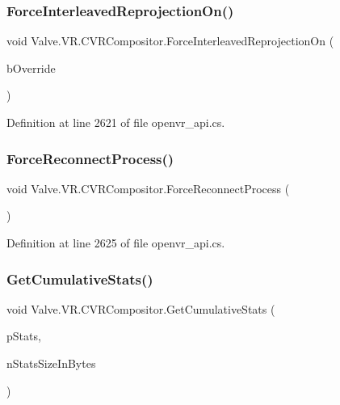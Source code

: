 \subsubsection{\texorpdfstring{ForceInterleavedReprojectionOn()}{ForceInterleavedReprojectionOn()}}
{\footnotesize\ttfamily void Valve.\+V\+R.\+C\+V\+R\+Compositor.\+Force\+Interleaved\+Reprojection\+On (\begin{DoxyParamCaption}\item[{bool}]{b\+Override }\end{DoxyParamCaption})}



Definition at line 2621 of file openvr\+\_\+api.\+cs.

\mbox{\label{class_valve_1_1_v_r_1_1_c_v_r_compositor_ac898f49a56bea56a40856b0a28e2245b}} 
\subsubsection{\texorpdfstring{ForceReconnectProcess()}{ForceReconnectProcess()}}
{\footnotesize\ttfamily void Valve.\+V\+R.\+C\+V\+R\+Compositor.\+Force\+Reconnect\+Process (\begin{DoxyParamCaption}{ }\end{DoxyParamCaption})}



Definition at line 2625 of file openvr\+\_\+api.\+cs.

\mbox{\label{class_valve_1_1_v_r_1_1_c_v_r_compositor_a47169fba7086633b916298a44925c873}} 
\subsubsection{\texorpdfstring{GetCumulativeStats()}{GetCumulativeStats()}}
{\footnotesize\ttfamily void Valve.\+V\+R.\+C\+V\+R\+Compositor.\+Get\+Cumulative\+Stats (\begin{DoxyParamCaption}\item[{ref \mbox{\hyperlink{struct_valve_1_1_v_r_1_1_compositor___cumulative_stats}{Compositor\+\_\+\+Cumulative\+Stats}}}]{p\+Stats,  }\item[{uint}]{n\+Stats\+Size\+In\+Bytes }\end{DoxyParamCaption})}



